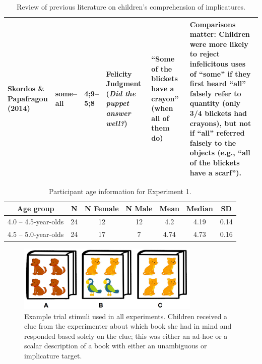\documentclass[man]{apa2}
\begin{document}
\begin{landscape}
\begin{table}[!ht]
\begin{tabular}{| p{2.2cm} | p{2cm} | p{1.69cm} | p{4.5cm} | p{5cm} | p{7.2cm} |}
\parbox[t]{2.2cm}{Skordos \&\\Papafragou (2014)} & some--all & 4;9--5;8 & Felicity Judgment (\textit{Did the puppet answer well?}) & ``Some of the blickets have a crayon'' (when all of them do)  & Comparisons matter: Children were more likely to reject infelicitous uses of ``some'' if they first heard ``all'' falsely refer to quantity (only 3/4 blickets had crayons), but not if ``all'' referred falsely to the objects (e.g., ``all of the blickets have a scarf'').\\ \hline \end{tabular}
\caption{\label{tab:lit_review}Review of previous literature on children's comprehension of implicatures.}
\end{table}
\end{landscape}
\restoregeometry

\newpage

\begin{table}[tb]
\centering
\begin{tabular}{ccccccc}
\hline
{\bf Age group} & {\bf N} & {\bf N Female} & {\bf N Male} & {\bf Mean} & {\bf Median} & {\bf SD} \\
\hline
4.0 -- 4.5-year-olds & 24 & 12 & 12 & 4.2 & 4.19 & 0.14 \\
4.5 -- 5.0-year-olds & 24 & 17 & 7 & 4.74 & 4.73 & 0.16\\
\hline
\end{tabular}
\caption{\label{tab:exp_1_demo}Participant age information for Experiment 1.}
\end{table}

\begin{figure}
 \begin{center}
  \includegraphics[height=1.25in]{figures/implicatures_demo_letters.png}
  \caption{\label{fig:demo} Example trial stimuli used in all experiments. Children received a clue from the experimenter about which book she had in mind and responded based solely on the clue; this was either an ad-hoc or a scalar description of a book with either an unambiguous or implicature target.}
 \end{center}
\end{figure}
\end{document}
